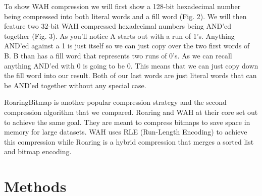 \documentclass{article}
\begin{document}
To show WAH compression we will first show a 128-bit hexadecimal number being compressed into both literal words and a fill word (Fig. 2). We will then feature two 32-bit WAH compressed hexadecimal numbers being AND’ed together (Fig. 3). As you’ll notice A starts out with a run of 1’s. Anything AND’ed against a 1 is just itself so we can just copy over the two first words of B. B than has a fill word that represents two runs of 0’s. As we can recall anything AND’ed with 0 is going to be 0. This means that we can just copy down the fill word into our result. Both of our last words are just literal words that can be AND’ed together without any special case. \par



RoaringBitmap is another popular compression strategy and the second compression algorithm that we compared. Roaring and WAH at their core set out to achieve the same goal. They are meant to compress bitmaps to save space in memory for large datasets. WAH uses RLE (Run-Length Encoding) to achieve this compression while Roaring is a hybrid compression that merges a sorted list and bitmap encoding. \par


%
%
\section{Methods}
%
%
\end{document}
